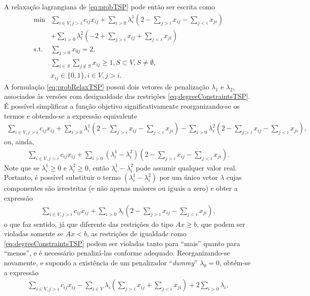 {A relaxação lagrangiana de \eqref{eq:probTSP} pode então ser escrita como
\begin{align}
	\min & \sum_{i \in V, j > i} c_{ij} x_{ij} + \sum_{i > 0} \lambda^1_i \left(2 - \sum_{j>i} x_{ij} - \sum_{j<i} x_{ji}\right)  \nonumber \\
			 &+ \sum_{i>0} \lambda^2_i \left(-2 + \sum_{j>i} x_{ij} + \sum_{j<i} x_{ji}\right) \tag{TSP$_\lambda$}\label{eq:probRelaxTSP} \\
	\text{s.t. } & \sum_{j>0} x_{0j} = 2, \label{} \\
	& \sum_{i \in S}\sum_{j \notin S} x_{ij} \geq 1, S \subset V, S \neq \emptyset, \label{} \\
	& x_{ij} \in \{0,1\}, i \in V, j > i. \label{}
\end{align}
A formulação \eqref{eq:probRelaxTSP} possui dois vetores de penalização $\lambda_1$ e $\lambda_2$, associados às versões com desigualdade das restrições \eqref{eq:degreeConstraintsTSP}. É possível simplificar a função objetivo significativamente reorganizando-se os termos e obtendo-se a expressão equivalente
\begin{align*}
	\sum_{i \in V, j > i} c_{ij} x_{ij} + \sum_{i > 0} \lambda^1_i \left(2 - \sum_{j>i} x_{ij} - \sum_{j<i} x_{ji}\right)	- \sum_{i>0} \lambda^2_i \left(2 - \sum_{j>i} x_{ij} - \sum_{j<i} x_{ji}\right),
\end{align*}
ou, ainda,
\begin{align*}
	\sum_{i \in V, j > i} c_{ij} x_{ij} + \sum_{i > 0} (\lambda^1_i - \lambda^2_i) \left(2 - \sum_{j>i} x_{ij} - \sum_{j<i} x_{ji}\right).
\end{align*}
Note que se $\lambda_i^1 \geq 0$ e $\lambda_i^2 \geq 0$, então $\lambda_i^1 - \lambda_i^2$ pode assumir qualquer valor real. Portanto, é possível substituir o termo $(\lambda_i^1 - \lambda_i^2)$ por um único vetor $\lambda$ cujas componentes são irrestritas (e não apenas maiores ou iguais a zero) e obter a expressão
\begin{align*}
	\sum_{i \in V, j > i} c_{ij} x_{ij} + \sum_{i > 0} \lambda_i \left(2 - \sum_{j>i} x_{ij} - \sum_{j<i} x_{ji}\right),
\end{align*}
o que faz sentido, já que diferente das restrições do tipo $Ax \geq b$, que podem ser violadas somente se $Ax < b$, as restrições de igualdade como \eqref{eq:degreeConstraintsTSP} podem ser violadas tanto para ``mais'' quanto para ``menos'', e é necessário penalizá-las conforme adequado. Reorganizando-se novamente, e supondo a existência de um penalizador ``\textit{dummy}'' $\lambda_0 = 0$, obtém-se a expressão 
\begin{align}
	\sum_{i \in V, j > i} c_{ij} x_{ij} - \sum_{i \in V} \lambda_i \left( \sum_{j>i} x_{ij} + \sum_{j<i} x_{ji} \right) + 2 \sum_{i>0} \lambda_i \label{eq:exprObjTSPLagrang1},
\end{align}

}
